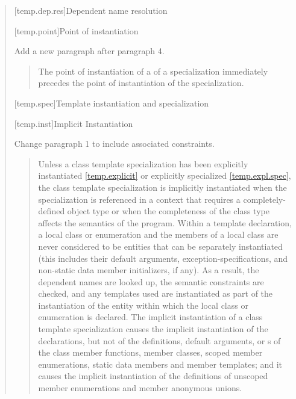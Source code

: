 \begin{quote}
\setcounter{subsection}{3}
[temp.dep.res]{Dependent name resolution}

[temp.point]{Point of instantiation}

Add a new paragraph after paragraph 4.

\begin{quote}
\setcounter{Paras}{4}
\pnum
The point of instantiation of a  of a
specialization immediately precedes the point of instantiation of
the specialization.
\end{quote}


[temp.spec]{Template instantiation and specialization}

[temp.inst]{Implicit Instantiation}
    
Change paragraph 1 to include associated constraints.

\begin{quote}
Unless a class template specialization has been explicitly
instantiated \ref{temp.explicit} or explicitly specialized \ref{temp.expl.spec}, 
the class template specialization is implicitly instantiated when the
specialization is referenced in a context that requires a
completely-defined object type or when the completeness of the
class type affects the semantics of the program. 
% 
\enternote
Within a template declaration, a local class or enumeration and the members
of a local class are never considered to be entities that can be
separately instantiated (this includes their default arguments,
exception-specifications, and non-static data member initializers, if any). 
% 
As a result, the dependent names are looked up, the semantic constraints 
are checked, and any templates used are instantiated as part of the
instantiation of the entity within which the local class or enumeration is 
declared.
\exitnote
% 
The implicit instantiation of a class template specialization causes the 
implicit instantiation of the declarations, but not of the definitions, default
arguments,  or
s of the class member functions,
member classes, scoped member enumerations, static data members and
member templates; and it causes the implicit instantiation of the
definitions of unscoped member enumerations and member anonymous
unions.
\end{quote}



\end{quote}
